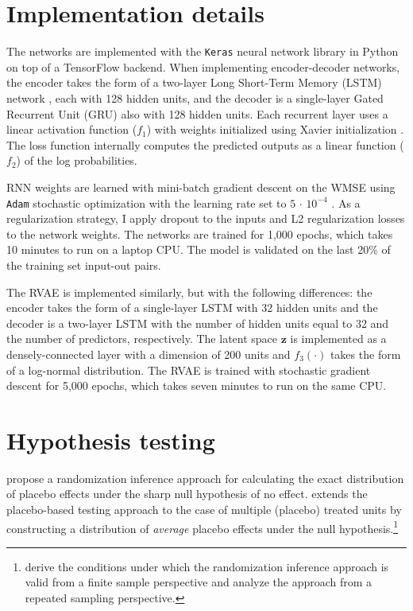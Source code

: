 \documentclass[hidelinks,12pt]{article}
\begin{document}
\begin{appendices}

\setcounter{figure}{0}
\renewcommand{\thefigure}{A\arabic{figure}}

\section{Implementation details} \label{imp}

The networks are implemented with the \texttt{Keras} neural network library \citep{chollet2015keras} in Python on top of a TensorFlow backend. When implementing encoder-decoder networks, the encoder takes the form of a two-layer Long Short-Term Memory (LSTM) network \citep{schmidhuber1997long}, each with 128 hidden units, and the decoder is a single-layer Gated Recurrent Unit (GRU) \citep{chung2014} also with 128 hidden units. Each recurrent layer uses a linear activation function ($f_1$) with weights initialized using Xavier initialization \citep{glorot2010}. The loss function internally computes the predicted outputs as a linear function ($f_2$) of the log probabilities. 

RNN weights are learned with mini-batch gradient descent on the WMSE using \texttt{Adam} stochastic optimization with the learning rate set to $5\,\cdot\,10^{-4}$ \citep{kingma2014adam}. As a regularization strategy, I apply dropout to the inputs and L2 regularization losses to the network weights. The networks are trained for 1,000 epochs, which takes 10 minutes to run on a laptop CPU. The model is validated on the last 20\% of the training set input-out pairs.  

The RVAE is implemented similarly, but with the following differences: the encoder takes the form of a single-layer LSTM with 32 hidden units and the decoder is a two-layer LSTM with the number of hidden units equal to 32 and the number of predictors, respectively. The latent space $\boldsymbol{z}$ is implemented as a densely-connected layer with a dimension of 200 units and $f_3(\cdot)$ takes the form of a log-normal distribution. The RVAE is trained with stochastic gradient descent for 5,000 epochs, which takes seven minutes to run on the same CPU.

\clearpage
\section{Hypothesis testing} \label{eval}

\citet{abadie2010synthetic} propose a randomization inference approach for calculating the exact distribution of placebo effects under the sharp null hypothesis of no effect. \citet{cavallo2013catastrophic} extends the placebo-based testing approach to the case of multiple (placebo) treated units by constructing a distribution of \emph{average} placebo effects under the null hypothesis.\footnote{\citet{firpo2018synthetic} derive the conditions under which the randomization inference approach is valid from a finite sample perspective and \citet{hahn2017synthetic} analyze the approach from a repeated sampling perspective.} 


\end{appendices}
\end{document}
